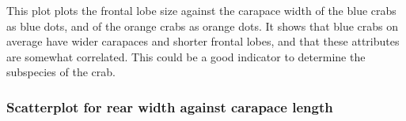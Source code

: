 \documentclass[
]{article}
\newenvironment{Shaded}{}{}
\newcommand{\AttributeTok}[1]{#1}
\newcommand{\CommentTok}[1]{\textcolor[rgb]{0.00,0.50,0.00}{#1}}
\newcommand{\FunctionTok}[1]{#1}
\newcommand{\NormalTok}[1]{#1}
\newcommand{\SpecialCharTok}[1]{\textcolor[rgb]{0.00,0.50,0.50}{#1}}
\newcommand{\StringTok}[1]{\textcolor[rgb]{0.00,0.50,0.50}{#1}}
\begin{document}
This plot plots the frontal lobe size against the carapace width of the
blue crabs as blue dots, and of the orange crabs as orange dots. It
shows that blue crabs on average have wider carapaces and shorter
frontal lobes, and that these attributes are somewhat correlated. This
could be a good indicator to determine the subspecies of the crab.
\newpage

\hypertarget{scatterplot-for-rear-width-against-carapace-length}{%
\subsubsection{Scatterplot for rear width against carapace
length}\label{scatterplot-for-rear-width-against-carapace-length}}

\begin{Shaded}
\end{Shaded}
\end{document}
